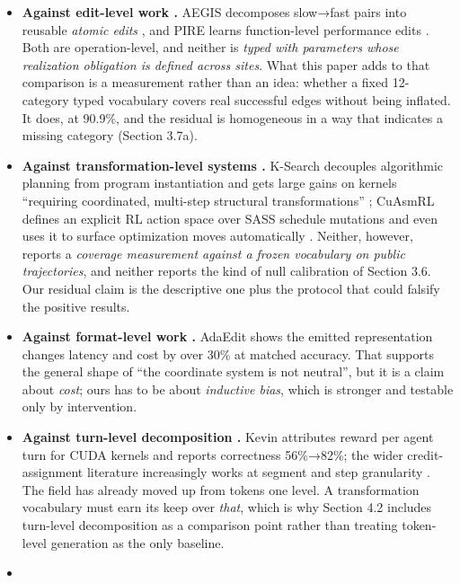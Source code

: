 \documentclass[
  11pt,
]{article}
\begin{document}
\begin{itemize}
\item
  \textbf{Against edit-level work \cite{learning4,neural5,llm31}.} AEGIS decomposes slow→fast pairs into reusable \emph{atomic edits} \cite{llm31}, and PIRE learns function-level performance edits \cite{learning4}. Both are operation-level, and neither is \emph{typed with parameters whose realization obligation is defined across sites}. What this paper adds to that comparison is a measurement rather than an idea: whether a fixed 12-category typed vocabulary covers real successful edges without being inflated. It does, at 90.9\%, and the residual is homogeneous in a way that indicates a missing category (Section 3.7a).
\item
  \textbf{Against transformation-level systems \cite{ksearch29,cuasmrl30}.} K-Search decouples algorithmic planning from program instantiation and gets large gains on kernels ``requiring coordinated, multi-step structural transformations'' \cite{ksearch29}; CuAsmRL defines an explicit RL action space over SASS schedule mutations and even uses it to surface optimization moves automatically \cite{cuasmrl30}. Neither, however, reports a \emph{coverage measurement against a frozen vocabulary on public trajectories}, and neither reports the kind of null calibration of Section 3.6. Our residual claim is the descriptive one plus the protocol that could falsify the positive results.
\item
  \textbf{Against format-level work \cite{to6}.} AdaEdit shows the emitted representation changes latency and cost by over 30\% at matched accuracy. That supports the general shape of ``the coordinate system is not neutral'', but it is a claim about \emph{cost}; ours has to be about \emph{inductive bias}, which is stronger and testable only by intervention.
\item
  \textbf{Against turn-level decomposition \cite{kevin32,from35}.} Kevin attributes reward per agent turn for CUDA kernels and reports correctness 56\%→82\%; the wider credit-assignment literature increasingly works at segment and step granularity \cite{from35}. The field has already moved up from tokens one level. A transformation vocabulary must earn its keep over \emph{that}, which is why Section 4.2 includes turn-level decomposition as a comparison point rather than treating token-level generation as the only baseline.
\item

\end{itemize}
\end{document}
